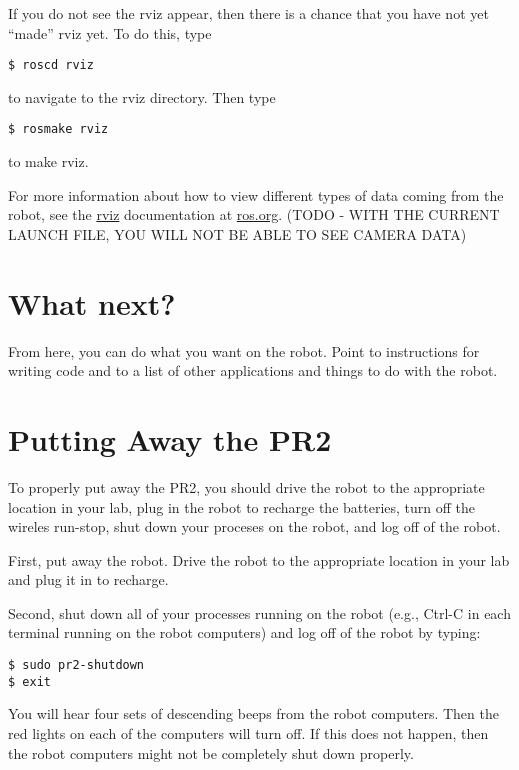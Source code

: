If you do not see the rviz appear, then there is a chance that you have not yet ``made'' rviz yet. To do this, type
\begin{verbatim}
$ roscd rviz
\end{verbatim}
to navigate to the rviz directory. Then type
\begin{verbatim}
$ rosmake rviz
\end{verbatim}
to make rviz.

For more information about how to view different types 
of data coming from the robot, see the \href{http://ros.org/wiki/rviz}{rviz} documentation at 
\href{http://www.ros.org}{ros.org}.
(TODO - WITH THE CURRENT LAUNCH FILE, YOU WILL NOT BE ABLE TO SEE CAMERA DATA)

\section{What next?}
From here, you can do what you want on the robot.  Point to instructions for writing code and to a list of other 
applications and things to do with the robot.

\section{Putting Away the PR2}
To properly put away the PR2, you should drive the robot to the appropriate location in your lab, plug in the robot to recharge the batteries, turn off the wireles run-stop, shut down your proceses on the robot, and log off of the robot.

First, put away the robot. Drive the robot to the appropriate location in your lab and plug it in to recharge.

Second, shut down all of your processes running on the robot (e.g., Ctrl-C in each terminal running on the robot computers) and log off of the robot by typing:
\begin{verbatim}
$ sudo pr2-shutdown
$ exit
\end{verbatim}
You will hear four sets of descending beeps from the robot computers. Then the red lights on each of the computers will turn off. If this does not happen, then the robot computers might not be completely shut down properly.

